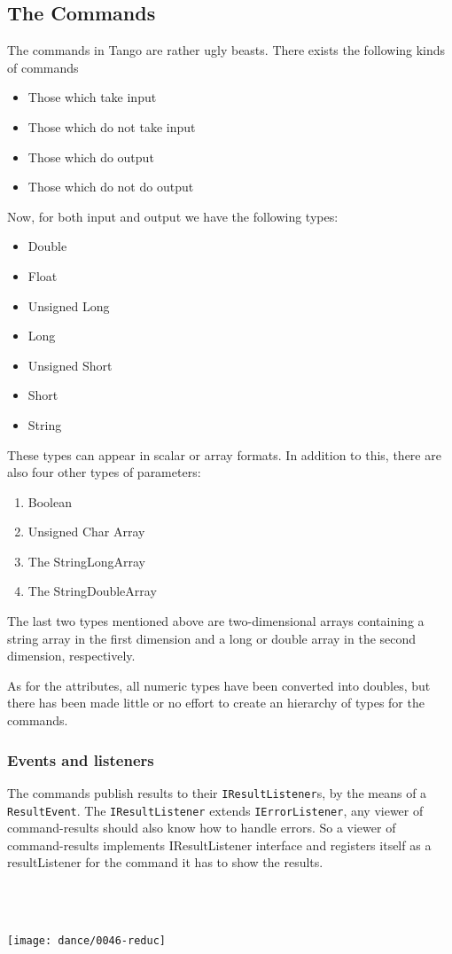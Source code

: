 \subsection{The Commands}

The commands in Tango are rather ugly beasts. There
exists the following kinds of commands
\begin{itemize}
\item Those which take input 
\item Those which do not take input 
\item Those which do output 
\item Those which do not do output 
\end{itemize}
Now, for both input and output we have the following types:
\begin{itemize}
\item Double 
\item Float
\item Unsigned Long
\item Long 
\item Unsigned Short
\item Short 
\item String
\end{itemize}
These types can appear in scalar or array formats. In addition to
this, there are also four other types of parameters:
\begin{enumerate}
\item Boolean
\item Unsigned Char Array
\item The StringLongArray 
\item The StringDoubleArray 
\end{enumerate}
The last two types mentioned above are two-dimensional arrays containing
a string array in the first dimension and a long or double array in
the second dimension, respectively.

As for the attributes, all numeric types have been converted into
doubles, but there has been made little or no effort to create an
hierarchy of types for the commands.


\subsubsection{Events and listeners}

The commands publish results to their \texttt{IResultListener}s, by
the means of a \texttt{ResultEvent}. The \texttt{IResultListener}
extends \texttt{IErrorListener}, any viewer of command-results
should also know how to handle errors. So a viewer of command-results
implements IResultListener interface and registers itself as a resultListener
for the command it has to show the results.
\begin{verbatim}
 


\end{verbatim}
\begin{center}
\label{TwoRicardo}\texttt{[image: dance/0046-reduc]}
\par\end{center}
